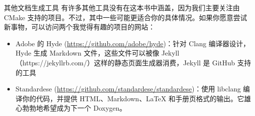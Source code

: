 \begin{myNotic}{其他文档生成工具}
有许多其他工具没有在这本书中涵盖，因为我们主要关注由 CMake 支持的项目。不过，其中一些可能更适合你的具体情况。如果你愿意尝试新事物，可以访问两个我觉得有趣的项目的网站：

\begin{itemize}
\item
Adobe 的 Hyde (\url{https://github.com/adobe/hyde})：针对 Clang 编译器设计，Hyde 生成 Markdown 文件，这些文件可以被像 Jekyll（https://jekyllrb.com/）这样的静态页面生成器消费，Jekyll 是 GitHub 支持的工具

\item
Standardese (\url{https://github.com/standardese/standardese})：使用 libclang 编译你的代码，并提供 HTML、Markdown、LaTeX 和手册页格式的输出。它雄心勃勃地希望成为下一个 Doxygen。
\end{itemize}
\end{myNotic}











































